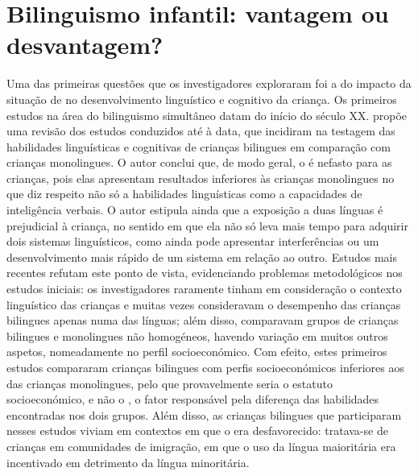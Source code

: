 \documentclass[output=paper]{LSP/langsci}
\begin{document}
\section{Bilinguismo infantil: vantagem ou desvantagem?}%
\label{sec:almeida_bilinguismo_infantil}

Uma das primeiras questões que os investigadores exploraram foi a do impacto da situação de  no desenvolvimento linguístico e cognitivo da criança. Os primeiros estudos na área do bilinguismo simultâneo datam do início do século XX. \citet{macnamara1966} propõe uma revisão dos estudos conduzidos até à data, que incidiram na testagem das habilidades linguísticas e cognitivas de crianças bilingues em comparação com crianças monolingues. O autor conclui que, de modo geral, o  é nefasto para as crianças, pois elas apresentam resultados inferiores às crianças monolingues no que diz respeito não só a habilidades linguísticas como a capacidades de inteligência verbais. O autor estipula ainda que a exposição a duas línguas é prejudicial à criança, no sentido em que ela não só leva mais tempo para adquirir dois sistemas linguísticos, como ainda pode apresentar interferências ou um desenvolvimento mais rápido de um sistema em relação ao outro. Estudos mais recentes refutam este ponto de vista, evidenciando problemas metodológicos nos estudos iniciais: os investigadores raramente tinham em consideração o contexto linguístico das crianças e muitas vezes consideravam o desempenho das crianças bilingues apenas numa das línguas; além disso, comparavam grupos de crianças bilingues e monolingues não homogéneos, havendo variação em muitos outros aspetos, nomeadamente no perfil socioeconómico. Com efeito, estes primeiros estudos compararam crianças bilingues com perfis socioeconómicos inferiores aos das crianças monolingues, pelo que provavelmente seria o estatuto socioeconómico, e não o , o fator responsável pela diferença das habilidades encontradas nos dois grupos. Além disso, as crianças bilingues que participaram nesses estudos viviam em contextos em que o  era desfavorecido: tratava-se de crianças em comunidades de imigração, em que o uso da língua maioritária era incentivado em detrimento da língua minoritária.
\end{document}
